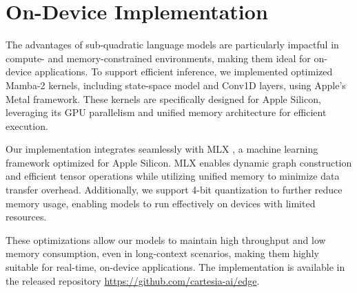 \section{On-Device Implementation}

The advantages of sub-quadratic language models are particularly impactful in compute- and memory-constrained environments, making them ideal for on-device applications. To support efficient inference, we implemented optimized Mamba-2 kernels, including state-space model and Conv1D layers, using Apple’s Metal framework. These kernels are specifically designed for Apple Silicon, leveraging its GPU parallelism and unified memory architecture for efficient execution.

Our implementation integrates seamlessly with MLX \citep{mlx2023}, a machine learning framework optimized for Apple Silicon. MLX enables dynamic graph construction and efficient tensor operations while utilizing unified memory to minimize data transfer overhead. Additionally, we support 4-bit quantization to further reduce memory usage, enabling models to run effectively on devices with limited resources.

These optimizations allow our models to maintain high throughput and low memory consumption, even in long-context scenarios, making them highly suitable for real-time, on-device applications.
The implementation is available in the released repository \url{https://github.com/cartesia-ai/edge}.